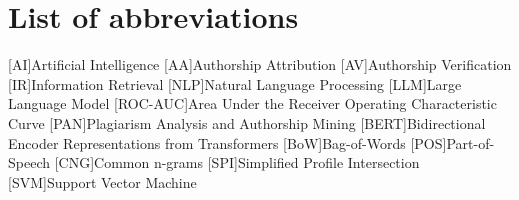\chapter*{List of abbreviations}

\begin{acronym}[XXXXXXXXX]
    [AI]{Artificial Intelligence}
    [AA]{Authorship Attribution}
    [AV]{Authorship Verification}
    [IR]{Information Retrieval}
    [NLP]{Natural Language Processing}
    [LLM]{Large Language Model}
    [ROC-AUC]{Area Under the Receiver Operating Characteristic Curve}
    [PAN]{Plagiarism Analysis and Authorship Mining} %
    [BERT]{Bidirectional Encoder Representations from Transformers}
    [BoW]{Bag-of-Words}
    [POS]{Part-of-Speech}
    [CNG]{Common n-grams}
    [SPI]{Simplified Profile Intersection}
    [SVM]{Support Vector Machine}

\end{acronym}
